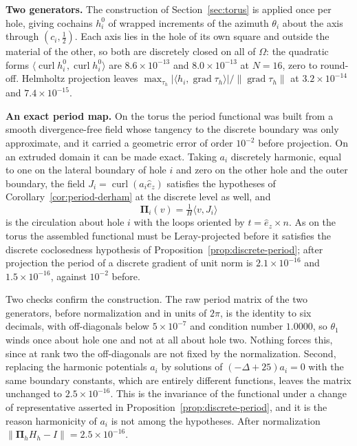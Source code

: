 \documentclass{article}
\DeclareMathOperator{\grad}{grad}
\DeclareMathOperator{\curl}{curl}
\newcommand{\Piop}{\boldsymbol\Pi}
\newcommand{\ip}[2]{\langle #1,#2\rangle}
\newcommand{\norm}[1]{\lVert #1\rVert}
\begin{document}
\medskip
\noindent\textbf{Two generators.}
The construction of Section~\ref{sec:torus} is applied once per hole, giving
cochains $h^{0}_{i}$ of wrapped increments of the azimuth $\theta_{i}$ about
the axis through $(c_{i},\tfrac12)$. Each axis lies in the hole of its own
square and outside the material of the other, so both are discretely closed on
all of $\Omega$: the quadratic forms $\ip{\curl h^{0}_{i}}{\curl h^{0}_{i}}$
are $8.6\times10^{-13}$ and $8.0\times10^{-13}$ at $N=16$, zero to round-off.
Helmholtz projection leaves
$\max_{\tau_{h}}|\ip{h_{i}}{\grad\tau_{h}}|/\norm{\grad\tau_{h}}$ at
$3.2\times10^{-14}$ and $7.4\times10^{-15}$.

\medskip
\noindent\textbf{An exact period map.}
On the torus the period functional was built from a smooth divergence-free
field whose tangency to the discrete boundary was only approximate, and it
carried a geometric error of order $10^{-2}$ before projection. On an extruded
domain it can be made exact. Taking $a_{i}$ discretely harmonic, equal to one
on the lateral boundary of hole $i$ and zero on the other hole and the outer
boundary, the field $J_{i}=\curl(a_{i}\hat e_{z})$ satisfies the hypotheses of
Corollary~\ref{cor:period-derham} at the discrete level as well, and
\[
  \Piop_{i}(v)=\tfrac1H\ip{v}{J_{i}}
\]
is the circulation about hole $i$ with the loops oriented by
$t=\hat e_{z}\times n$. As on the torus the assembled functional must be
Leray-projected before it satisfies the discrete coclosedness hypothesis of
Proposition~\ref{prop:discrete-period}; after projection the period of a
discrete gradient of unit norm is $2.1\times10^{-16}$ and
$1.5\times10^{-16}$, against $10^{-2}$ before.

Two checks confirm the construction. The raw period matrix of the two
generators, before normalization and in units of $2\pi$, is the identity to
six decimals, with off-diagonals below $5\times10^{-7}$ and condition number
$1.0000$, so $\theta_{1}$ winds once about hole one and not at all about hole
two. Nothing forces this, since at rank two the off-diagonals are not fixed by
the normalization. Second, replacing the harmonic potentials $a_{i}$ by
solutions of $(-\Delta+25)a_{i}=0$ with the same boundary constants, which are
entirely different functions, leaves the matrix unchanged to
$2.5\times10^{-16}$. This is the invariance of the functional under a change
of representative asserted in Proposition~\ref{prop:discrete-period}, and it
is the reason harmonicity of $a_{i}$ is not among the hypotheses. After
normalization $\norm{\Piop_{h}H_{h}-I}=2.5\times10^{-16}$.
\end{document}

